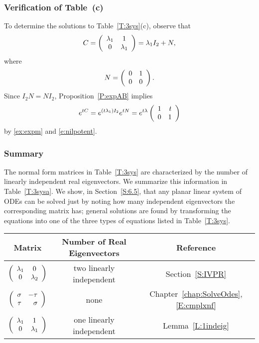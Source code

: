 \documentclass{ximera}
\begin{document}
\subsubsection{Verification of Table~\protect{\ref{T:3sys}}(c)}

To determine the solutions to Table~\ref{T:3sys}(c), observe that
\[
C = \left(\begin{array}{cc} \lambda_1 & 1\\ 0 &\lambda_1\end{array}\right) = \lambda_1 I_2 + N,
\]
where
\[
N = \left(\begin{array}{rr} 0 & 1\\ 0 &0\end{array}\right).
\]
Since $I_2N=NI_2$, Proposition~\ref{P:expAB} implies
\begin{equation}  \label{e:expshear}
e^{tC} = e^{(t\lambda_1)I_2}e^{tN} =
e^{t\lambda}\left(\begin{array}{rr} 1 & t\\ 0 &1\end{array}\right)
\end{equation}
by \eqref{ex:expm} and \eqref{e:nilpotent}.

\subsubsection{Summary}

The normal form matrices in Table~\ref{T:3sys} are characterized by the number
of linearly independent real eigenvectors.  We summarize this information in
Table~\ref{T:3sysa}.  We show, in Section~\ref{S:6.5}, that any planar
linear system of ODEs can be solved just by noting how many independent
eigenvectors the corresponding matrix has; general solutions are found by
transforming the equations into one of the three types of equations
listed in Table~\ref{T:3sys}.

\begin{table*}[htb]
\begin{center}
\begin{tabular}{|c|c|c|}
\hline
Matrix  & Number of Real Eigenvectors & Reference \\
\hline
 $\left(\begin{array}{cc} \lambda_1 & 0\\ 0 &\lambda_2\end{array}\right)$ & two linearly independent  &
Section~\ref{S:IVPR} \\
\hline
$\left(\begin{array}{rr} \sigma & -\tau\\ \tau &\sigma\end{array}\right)$ & none
& Chapter~\ref{chap:SolveOdes}, \eqref{E:cmplxnf} \\
\hline
$\left(\begin{array}{cc} \lambda_1 & 1\\ 0 &\lambda_1\end{array}\right)$ &  one linearly independent
& Lemma~\ref{L:1indeig} \\
\hline
\end{tabular}
\caption{Number of linearly independent real eigenvectors.}
\label{T:3sysa}
\end{center}
\end{table*}




\end{document}
